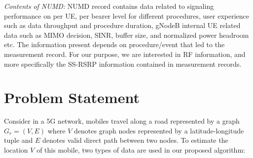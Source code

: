 \documentclass[conference, 10pt]{IEEEtran}
\begin{document}
{\em Contents of NUMD:} NUMD record contains data related to signaling performance on
per UE, per bearer level for different procedures, user experience such as data
throughput and procedure duration, gNodeB internal UE related data such as MIMO
decision, SINR, buffer size, and normalized power headroom etc.  The information
present depends on procedure/event that led to the measurement record. For our
purpose, we are interested in RF information, and more specifically the SS-RSRP information contained in measurement records. 
%
%
%
%
%





\section{Problem Statement} 
\label{sec:ps}

Consider in a 5G network, mobiles travel along a road represented by a graph $G_r=(V,E)$ where $V$
denotes graph nodes represented by a latitude-longitude tuple and $E$ denotes
valid direct path between two nodes. To estimate the location $V$ of this mobile, two types of data
are used in our proposed algorithm:
\end{document}
